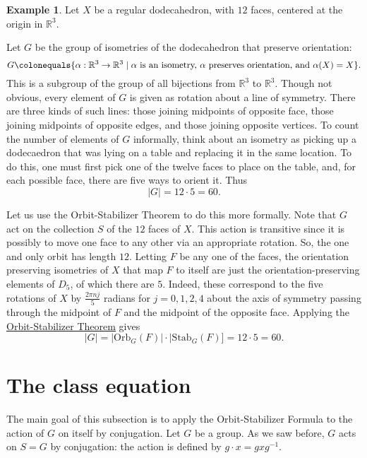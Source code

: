 \documentclass[12pt]{report}
\numberwithin{equation}{section}
\numberwithin{theorem}{chapter}
\theoremstyle{definition}
\newtheorem{example}[theorem]{Example}
\newtheorem*{basic properties}{Basic Properties}
\newtheorem*{Important Remark}{Important Remark}
\begin{document}
\begin{example} 
Let $X$ be a regular dodecahedron, with $12$ faces, centered at the origin in $\mathbb{R}^3$. 


Let $G$ be the group of isometries of the dodecahedron that preserve orientation:
$$G \colonequals \{\alpha : \mathbb{R}^3 \to \mathbb{R}^3 \mid \text{$\alpha$ is an isometry, $\alpha$ preserves orientation, and } \alpha(X) = X\}.$$
This is a subgroup of the group of all bijections from $\mathbb{R}^3$ to $\mathbb{R}^3$. Though not obvious, every element of $G$ is given as rotation about a line of symmetry. There are three kinds of such lines: those joining midpoints of opposite face, those joining midpoints of opposite edges, and those joining opposite vertices.  To count the number of elements of $G$ informally, think about an isometry as picking up a dodecaedron that was lying on a table and replacing it in the same location.  To do this, one must first pick one of the twelve faces to place on the table, and, for each possible face, there are five ways to orient it. Thus 
$$|G|=12 \cdot 5 = 60.$$

Let us use the Orbit-Stabilizer Theorem to do this more formally. Note that $G$ act on the collection $S$ of the $12$ faces of $X$. This action is transitive since it is possibly to move one face to any other via an appropriate rotation. So, the one and only orbit has length $12$. Letting $F$ be any one of the faces, the orientation preserving isometries of $X$ that map $F$ to itself are just the orientation-preserving elements of $D_{5}$, of which there are $5$. Indeed, these correspond to the five rotations of $X$ by $\frac{2 \pi n j}{5}$ radians for $j =0,1,2,4$ about the axis of symmetry passing through the midpoint of $F$ and the midpoint of the opposite face.
  Applying the \hyperref[Orbit-Stabilizer Theorem]{Orbit-Stabilizer Theorem} gives
$$|G|=|\mathrm{Orb}_G(F)|\cdot |\mathrm{Stab}_G(F)]=12 \cdot 5=60.$$
\end{example}





\section{The class equation}

The main goal of this subsection is to apply the Orbit-Stabilizer Formula to the action of $G$ on itself by conjugation. 
Let $G$ be a group. As we saw before, $G$ acts on $S = G$ by conjugation: the action is defined by $g \cdot x=gxg^{-1}$.
\end{document}
